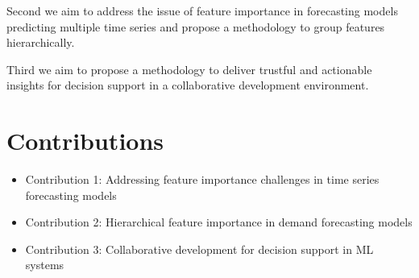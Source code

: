 Second we aim to address the issue of feature importance in forecasting models predicting multiple time series and propose a methodology to group features hierarchically.

Third we aim to propose a methodology to deliver trustful and actionable insights for decision support in a collaborative development environment.



\section[Contributions]{Contributions}

\begin{itemize}
    \item Contribution 1: Addressing feature importance challenges in time series forecasting models
    \item Contribution 2: Hierarchical feature importance in demand forecasting models
    \item Contribution 3: Collaborative development for decision support in ML systems
\end{itemize}





